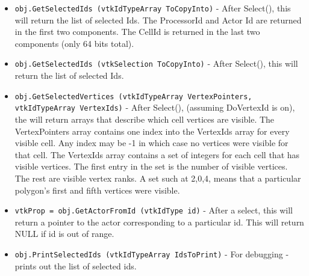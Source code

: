 \begin{itemize}
\item  \verb|obj.GetSelectedIds (vtkIdTypeArray ToCopyInto)| -  After Select(), this will return the list of selected Ids.
 The ProcessorId and Actor Id are returned in the first two components.
 The CellId is returned in the last two components (only 64 bits total).

\item  \verb|obj.GetSelectedIds (vtkSelection ToCopyInto)| -  After Select(), this will return the list of selected Ids.

\item  \verb|obj.GetSelectedVertices (vtkIdTypeArray VertexPointers, vtkIdTypeArray VertexIds)| -  After Select(), (assuming DoVertexId is on), the will return arrays that
 describe which cell vertices are visible.
 The VertexPointers array contains one index into the VertexIds array for
 every visible cell. Any index may be -1 in which case no vertices were 
 visible for that cell. The VertexIds array contains a set of integers for
 each cell that has visible vertices. The first entry in the set is
 the number of visible vertices. The rest are visible vertex ranks. 
 A set such at 2,0,4, means that a particular polygon's first and fifth
 vertices were visible.

\item  \verb|vtkProp = obj.GetActorFromId (vtkIdType id)| -  After a select, this will return a pointer to the actor corresponding to
 a particular id. This will return NULL if id is out of range.

\item  \verb|obj.PrintSelectedIds (vtkIdTypeArray IdsToPrint)| -  For debugging - prints out the list of selected ids.

\end{itemize}
